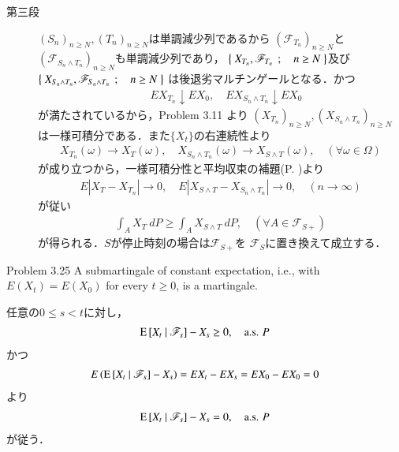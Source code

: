 \begin{prf}
\begin{description}
			\item[第三段]
				$(S_n)_{n \geq N},(T_n)_{n \geq N}$は単調減少列であるから
				$\left( \mathscr{F}_{T_n} \right)_{n \geq N}$と
				$\left( \mathscr{F}_{S_n \wedge T_n} \right)_{n \geq N}$も単調減少列であり，
				$\left\{\ X_{T_n},\mathscr{F}_{T_n}\ \, ; \quad n \geq N\ \right\}$及び
				$\left\{\ X_{S_n \wedge T_n},\mathscr{F}_{S_n \wedge T_n}\ \, ; \quad n \geq N\ \right\}$
				は後退劣マルチンゲールとなる．かつ
				\begin{align}
					\quad EX_{T_n} \downarrow EX_0,
					\quad EX_{S_n \wedge T_n} \downarrow EX_0
				\end{align}
				が満たされているから，Problem 3.11 より
				$\left( X_{T_n} \right)_{n \geq N},\left( X_{S_n \wedge T_n} \right)_{n \geq N}$
				は一様可積分である．また$\{X_t\}$の右連続性より
				\begin{align}
					X_{T_n}(\omega) \longrightarrow X_T(\omega),
					\quad X_{S_n \wedge T_n}(\omega) \longrightarrow X_{S \wedge T}(\omega),
					\quad (\forall \omega \in \Omega)
				\end{align}
				が成り立つから，一様可積分性と平均収束の補題(P. \pageref{lem:uniformly_integrable_and_convergence_in_mean})より
				\begin{align}
					E\left| X_T - X_{T_n} \right| \longrightarrow 0,
					\quad E\left| X_{S \wedge T} - X_{S_n \wedge T_n} \right| \longrightarrow 0,
					\quad (n \longrightarrow \infty)
				\end{align}
				が従い
				\begin{align}
					\int_A X_T\ dP \geq \int_A X_{S \wedge T}\ dP,
					\quad (\forall A \in \mathscr{F}_{S+})
				\end{align}
				が得られる．$S$が停止時刻の場合は$\mathscr{F}_{S+}$を
				$\mathscr{F}_S$に置き換えて成立する．
				\QED
		\end{description}
	\end{prf}
	
	\begin{itembox}[l]{Problem 3.25}
		A submartingale of constant expectation, i.e., with $E(X_t) = E(X_0)$ for every $t \geq 0$, is a martingale. 
	\end{itembox}
	
	\begin{prf}
		任意の$0 \leq s < t$に対し，
		\begin{align}
			\operatorname{E} \left[ X_t \ \middle|\ \mathscr{F}_s \right] - X_s \geq 0,
			\quad \mbox{a.s. $P$}
		\end{align}
		かつ
		\begin{align}
			E\left( \operatorname{E} \left[ X_t \ \middle|\ \mathscr{F}_s \right] - X_s \right)
			= EX_t - EX_s
			= EX_0 - EX_0
			= 0
		\end{align}
		より
		\begin{align}
			\operatorname{E} \left[ X_t \ \middle|\ \mathscr{F}_s \right] - X_s = 0,
			\quad \mbox{a.s. $P$}
		\end{align}
		が従う．
		\QED
	\end{prf}
	
